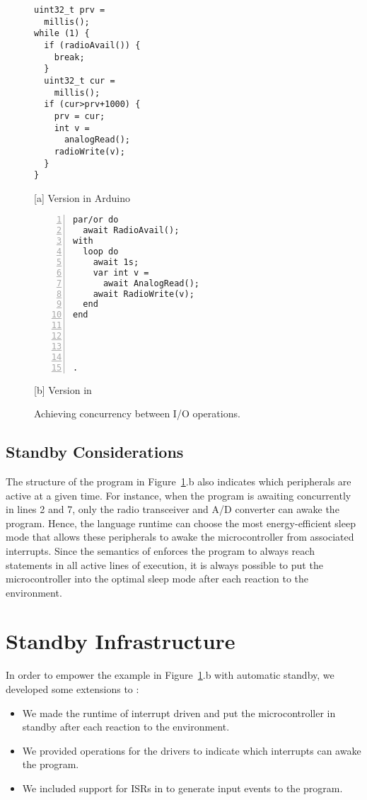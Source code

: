 \begin{figure}[t]
\begin{minipage}[t]{0.49\linewidth}
\begin{lstlisting}[xrightmargin=0.5cm]
uint32_t prv =
  millis();
while (1) {
  if (radioAvail()) {
    break;
  }
  uint32_t cur =
    millis();
  if (cur>prv+1000) {
    prv = cur;
    int v =
      analogRead();
    radioWrite(v);
  }
}
\end{lstlisting}
\centering\small{[a] Version in Arduino}
\end{minipage}
%
\begin{minipage}[t]{0.49\linewidth}
\begin{lstlisting}[numbers=left,xleftmargin=-0.2cm]
par/or do
  await RadioAvail();
with
  loop do
    await 1s;
    var int v =
      await AnalogRead();
    await RadioWrite(v);
  end
end




.
\end{lstlisting}
\centering\small{[b] Version in \CEU}
\end{minipage}
\caption{ Achieving concurrency between I/O operations.
\label{lst.inversion}
}
\end{figure}

\subsection*{Standby Considerations}
\label{sec.ceu.standby}

The structure of the program in Figure~\ref{lst.inversion}.b also indicates
which peripherals are active at a given time.
%
For instance, when the program is awaiting concurrently in lines 2 and 7,
only the radio transceiver and A/D converter can awake the program.
Hence, the language runtime can choose the most energy-efficient sleep mode
that allows these peripherals to awake the microcontroller from associated
interrupts.
%
Since the semantics of \CEU enforces the program to always reach 
statements in all active lines of execution, it is always possible to put the
microcontroller into the optimal sleep mode after each reaction to the
environment.

\section{Standby Infrastructure}
\label{sec.standby}

In order to empower the example in Figure~\ref{lst.inversion}.b with automatic
standby, we developed some extensions to \CEU:
%
\begin{itemize}
\item We made the runtime of \CEU interrupt driven and put the microcontroller
      in standby after each reaction to the environment.
\item We provided operations for the drivers to indicate which interrupts can
      awake the program.
\item We included support for ISRs in \CEU to generate input events to the
      program.
\end{itemize}

